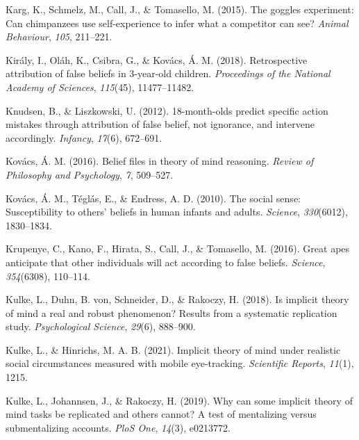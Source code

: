 \documentclass[
  english,
  man,floatsintext]{apa6}
\newlength{\cslhangindent}
\newlength{\cslentryspacingunit} %
\newenvironment{CSLReferences}[2] %
 {%
  \setlength{\parindent}{0pt}
  \ifodd #1
  \let\oldpar\par
  \def\par{\hangindent=\cslhangindent\oldpar}
  \fi
  \setlength{\parskip}{#2\cslentryspacingunit}
 }%
 {}
\begin{document}
\begin{CSLReferences}{1}{0}
\leavevmode{}%
Karg, K., Schmelz, M., Call, J., \& Tomasello, M. (2015). The goggles experiment: Can chimpanzees use self-experience to infer what a competitor can see? \emph{Animal Behaviour}, \emph{105}, 211--221.

\leavevmode{}%
Király, I., Oláh, K., Csibra, G., \& Kovács, Á. M. (2018). Retrospective attribution of false beliefs in 3-year-old children. \emph{Proceedings of the National Academy of Sciences}, \emph{115}(45), 11477--11482.

\leavevmode{}%
Knudsen, B., \& Liszkowski, U. (2012). 18-month-olds predict specific action mistakes through attribution of false belief, not ignorance, and intervene accordingly. \emph{Infancy}, \emph{17}(6), 672--691.

\leavevmode{}%
Kovács, Á. M. (2016). Belief files in theory of mind reasoning. \emph{Review of Philosophy and Psychology}, \emph{7}, 509--527.

\leavevmode{}%
Kovács, Á. M., Téglás, E., \& Endress, A. D. (2010). The social sense: Susceptibility to others' beliefs in human infants and adults. \emph{Science}, \emph{330}(6012), 1830--1834.

\leavevmode{}%
Krupenye, C., Kano, F., Hirata, S., Call, J., \& Tomasello, M. (2016). Great apes anticipate that other individuals will act according to false beliefs. \emph{Science}, \emph{354}(6308), 110--114.

\leavevmode{}%
Kulke, L., Duhn, B. von, Schneider, D., \& Rakoczy, H. (2018). Is implicit theory of mind a real and robust phenomenon? Results from a systematic replication study. \emph{Psychological Science}, \emph{29}(6), 888--900.

\leavevmode{}%
Kulke, L., \& Hinrichs, M. A. B. (2021). Implicit theory of mind under realistic social circumstances measured with mobile eye-tracking. \emph{Scientific Reports}, \emph{11}(1), 1215.

\leavevmode{}%
Kulke, L., Johannsen, J., \& Rakoczy, H. (2019). Why can some implicit theory of mind tasks be replicated and others cannot? A test of mentalizing versus submentalizing accounts. \emph{PloS One}, \emph{14}(3), e0213772.


\end{CSLReferences}
\end{document}
